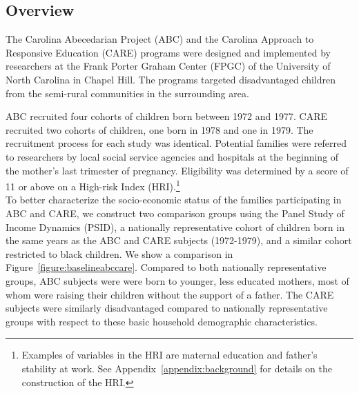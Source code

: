 \subsection{Overview}

\noindent The Carolina Abecedarian Project (ABC) and the Carolina Approach to Responsive Education (CARE) programs were designed and implemented by researchers at the Frank Porter Graham Center (FPGC) of the University of North Carolina in Chapel Hill. The programs targeted disadvantaged children from the semi-rural communities in the surrounding area. 

\noindent ABC recruited four cohorts of children born between 1972 and 1977. CARE recruited two cohorts of children, one born in 1978 and one in 1979. The recruitment process for each study was identical. Potential families were referred to researchers by local social service agencies and hospitals at the beginning of the mother's last trimester of pregnancy. Eligibility was determined by a score of 11 or above on a High-risk Index (HRI).\footnote{Examples of variables in the HRI are maternal education and father's stability at work. See Appendix~\ref{appendix:background} for details on the construction of the HRI.} \\

\noindent To better characterize the socio-economic status of the families participating in ABC and CARE, we construct two comparison groups using the Panel Study of Income Dynamics (PSID), a nationally representative cohort of children born in the same years as the ABC and CARE subjects (1972-1979), and a similar cohort restricted to black children. We show a comparison in Figure~\ref{figure:baselineabccare}. Compared to both nationally representative groups, ABC subjects were were born to younger, less educated mothers, most of whom were raising their children without the support of a father. The CARE subjects were similarly disadvantaged compared to nationally representative groups with respect to these basic household demographic characteristics.\\

